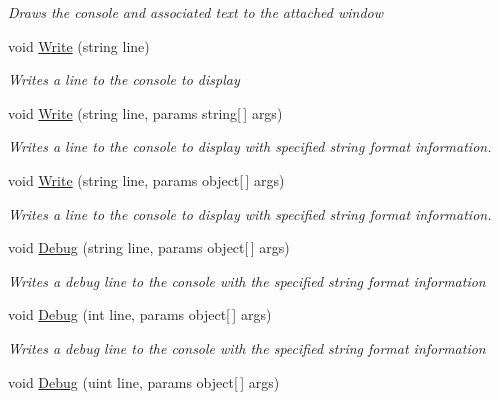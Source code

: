 \begin{DoxyCompactItemize}
\begin{DoxyCompactList}\small\item\em Draws the console and associated text to the attached window \end{DoxyCompactList}\item 
void \hyperlink{class_midnight_blue_1_1_engine_1_1_m_b_console_ac1a75f46018d9e2c1132f2e77160ea48}{Write} (string line)
\begin{DoxyCompactList}\small\item\em Writes a line to the console to display \end{DoxyCompactList}\item 
void \hyperlink{class_midnight_blue_1_1_engine_1_1_m_b_console_af2f6965b500048bb867b822ce99006fe}{Write} (string line, params string\mbox{[}$\,$\mbox{]} args)
\begin{DoxyCompactList}\small\item\em Writes a line to the console to display with specified string format information. \end{DoxyCompactList}\item 
void \hyperlink{class_midnight_blue_1_1_engine_1_1_m_b_console_a1c6f02e42d8c57e933cebf6022ec3389}{Write} (string line, params object\mbox{[}$\,$\mbox{]} args)
\begin{DoxyCompactList}\small\item\em Writes a line to the console to display with specified string format information. \end{DoxyCompactList}\item 
void \hyperlink{class_midnight_blue_1_1_engine_1_1_m_b_console_a99525d45031da45b97230010d767eb0a}{Debug} (string line, params object\mbox{[}$\,$\mbox{]} args)
\begin{DoxyCompactList}\small\item\em Writes a debug line to the console with the specified string format information \end{DoxyCompactList}\item 
void \hyperlink{class_midnight_blue_1_1_engine_1_1_m_b_console_a335cd63ac3668739453d757c82f107bb}{Debug} (int line, params object\mbox{[}$\,$\mbox{]} args)
\begin{DoxyCompactList}\small\item\em Writes a debug line to the console with the specified string format information \end{DoxyCompactList}\item 
void \hyperlink{class_midnight_blue_1_1_engine_1_1_m_b_console_a42e214eb86728d3c7d9628fb11292854}{Debug} (uint line, params object\mbox{[}$\,$\mbox{]} args)

\end{DoxyCompactItemize}
